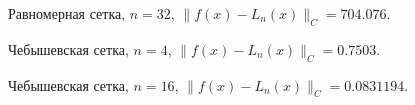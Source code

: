 \documentclass[12pt, a4paper]{article}
\begin{document}
\pagebreak


\begin{figure}[h]
    \caption{Равномерная сетка, $n = 32$, $ \| f(x) - L_n(x)  \|_C = 704.076 $.}
\end{figure}

\begin{figure}[h]
    \caption{Чебышевская сетка, $n = 4$, $ \| f(x) - L_n(x)  \|_C = 0.7503 $.}
\end{figure}

\pagebreak


\begin{figure}[h]
    \caption{Чебышевская сетка, $n = 16$, $ \| f(x) - L_n(x)  \|_C = 0.0831194 $.}
\end{figure}
\end{document}
